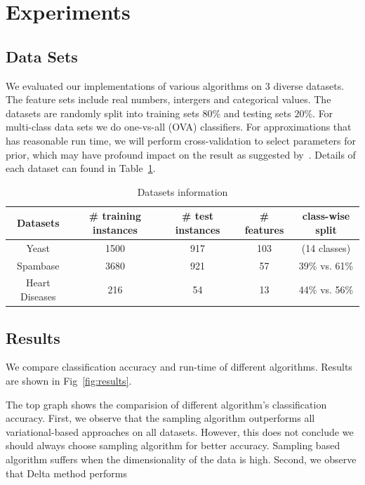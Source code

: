 \section{Experiments}
\label{sec:experiments}

\subsection{Data Sets}

We evaluated our implementations of various algorithms on 3 diverse datasets. The feature sets include real numbers, intergers and categorical values. The datasets are randomly split into training sets $80\%$ and
testing sets $20\%$. For multi-class data sets we do one-vs-all (OVA)
classifiers. For approximations that has reasonable run time, we will perform
cross-validation to select parameters for prior, which may have profound
impact on the result as suggested by~\cite{Asuncion2009smoothing}. Details of each dataset can found in Table~\ref{tb:datasets}.

\begin{table}
\begin{tabular}{| c | c |  c | c | c |}
  \hline
  Datasets & \# training instances & \# test instances & \# features & class-wise split\\
  \hline
  Yeast & 1500 & 917 & 103 & (14 classes) \\
  \hline
  Spambase & 3680 & 921 & 57 & 39\% vs. 61\% \\
  \hline
  Heart Diseases & 216 & 54 & 13 & 44\% vs. 56\% \\
  \hline
\end{tabular}

\caption{Datasets information}
\label{tb:datasets}
\end{table}

\subsection{Results}

We compare classification accuracy and run-time of different algorithms. Results are shown in Fig~\ref{fig:results}.

The top graph shows the comparision of different algorithm's classification accuracy. First, we observe that the sampling algorithm outperforms all variational-based approaches on all datasets. However, this does not conclude we should always choose sampling algorithm for better accuracy. Sampling based algorithm suffers when the dimensionality of the data is high. Second, we observe that Delta method performs 


